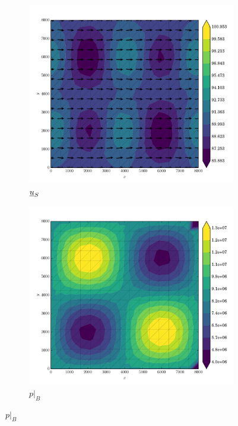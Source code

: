 \begin{figure}
  
  \centering 
  
  \begin{subfigure}[b]{0.3\linewidth}
    \includegraphics[width=\linewidth]{images/stress_balance/FS/U_mag.pdf}
  \caption{$\underline{u}_S$}
  \label{fs_msb_U}
  \end{subfigure}
  \begin{subfigure}[b]{0.3\linewidth}
    \includegraphics[width=\linewidth]{images/stress_balance/FS/p.pdf}
  \caption{$p |_B$}
  \label{fs_msb_p}
  \end{subfigure}


\end{figure}
